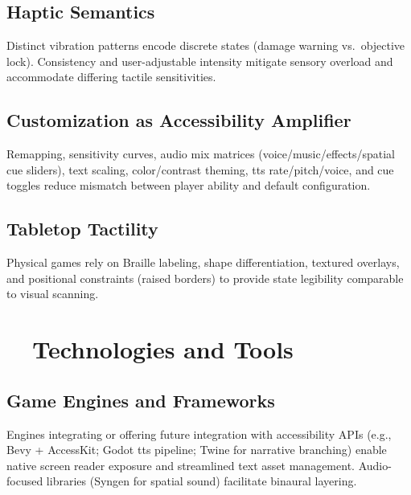 \subsection*{Haptic Semantics}
Distinct vibration patterns encode discrete states (damage warning vs.\ objective lock). Consistency and user-adjustable intensity mitigate sensory overload and accommodate differing tactile sensitivities.

\subsection*{Customization as Accessibility Amplifier}
Remapping, sensitivity curves, audio mix matrices (voice/music/effects/spatial cue sliders), text scaling, color/contrast theming, \gls{tts} rate/pitch/voice, and cue toggles reduce mismatch between player ability and default configuration\supercite{Wayline2025}.

\subsection*{Tabletop Tactility}
Physical games rely on Braille labeling, shape differentiation, textured overlays, and positional constraints (raised borders) to provide state legibility comparable to visual scanning.

\section{~~Technologies and Tools}
\label{sec:gaming-technologies}
\subsection*{Game Engines and Frameworks}
Engines integrating or offering future integration with accessibility APIs (e.g., Bevy + AccessKit; Godot \gls{tts} pipeline; Twine for narrative branching)\supercite{GitHubGameEngines} enable native screen reader exposure and streamlined text asset management. Audio-focused libraries (Syngen for spatial sound) facilitate binaural layering.

